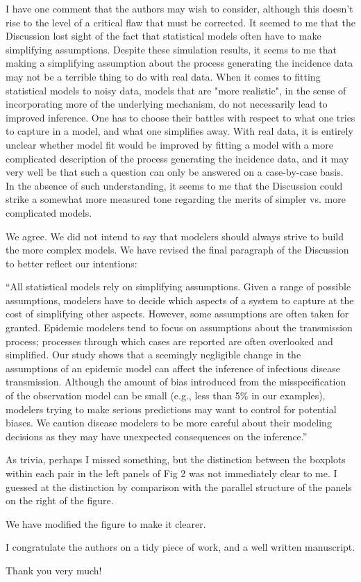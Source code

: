 \documentclass[12pt]{article}
\newcommand{\revtext}{\textsf}
\begin{document}
\revtext{I have one comment that the authors may wish to consider, although this doesn't rise to the level of a critical flaw that must be corrected.  It seemed to me that the Discussion lost sight of the fact that statistical models often have to make simplifying assumptions.  Despite these simulation results, it seems to me that making a simplifying assumption about the process generating the incidence data may not be a terrible thing to do with real data.  When it comes to fitting statistical models to noisy data, models that are "more realistic", in the sense of incorporating more of the underlying mechanism, do not necessarily lead to improved inference.  One has to choose their battles with respect to what one tries to capture in a model, and what one simplifies away.  With real data, it is entirely unclear whether model fit would be improved by fitting a model with a more complicated description of the process generating the incidence data, and it may very well be that such a
question can only be answered on a case-by-case basis.  In the absence of such understanding, it seems to me that the Discussion could strike a somewhat more measured tone regarding the merits of simpler vs. more complicated models.}

We agree. We did not intend to say that modelers should always strive to build the more complex models. We have revised the final paragraph of the Discussion to better reflect our intentions:

``All statistical models rely on simplifying assumptions.
Given a range of possible assumptions, modelers have to
decide which aspects of a system to capture 
at the cost of simplifying other aspects.
However, some assumptions are often taken for granted.
Epidemic modelers tend to focus on assumptions about the
transmission process; processes through which cases are reported are often 
overlooked and simplified.
Our study shows that a seemingly negligible change in the assumptions of an epidemic
model can affect the inference of 
infectious disease transmission.
Although the amount of bias introduced from the misspecification of the observation
model can be small (e.g., less than 5\% in our examples), modelers
trying to make serious predictions may want to control for potential biases.
We caution disease modelers to be more careful about their modeling decisions as they may have unexpected consequences on the inference.''

\revtext{As trivia, perhaps I missed something, but the distinction between the boxplots within each pair in the left panels of Fig 2 was not immediately clear to me.  I guessed at the distinction by comparison with the parallel structure of the panels on the right of the figure.}

We have modified the figure to make it clearer.

\revtext{I congratulate the authors on a tidy piece of work, and a well written manuscript.}

Thank you very much!
\end{document}
